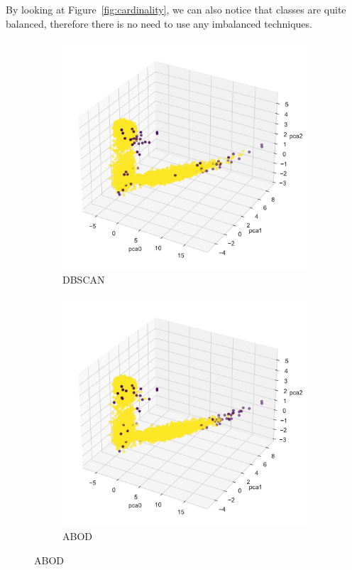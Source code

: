 \documentclass[10pt, a4paper, twocolumn]{article}
\begin{document}
By looking at Figure~\ref{fig:cardinality}, we can also notice that classes are quite balanced, therefore there is no need to use any imbalanced techniques.

\begin{figure}


  \begin{subfigure}[t]{0.49\columnwidth}
    \includegraphics[width=\linewidth]{immagini Lia/DBSCAN_anomaly_detection1.pdf}
    \caption{DBSCAN}
    \label{fig:dbscan}
  \end{subfigure}
  \hfill %
  \addtocounter{subfigure}{2}
  \begin{subfigure}[t]{0.49\columnwidth}
    \includegraphics[width=\linewidth]{immagini Lia/ABOD_anomaly_detection.pdf} 
    \caption{ABOD}
    \label{fig:abod}
  \end{subfigure}


\end{figure}
\end{document}
